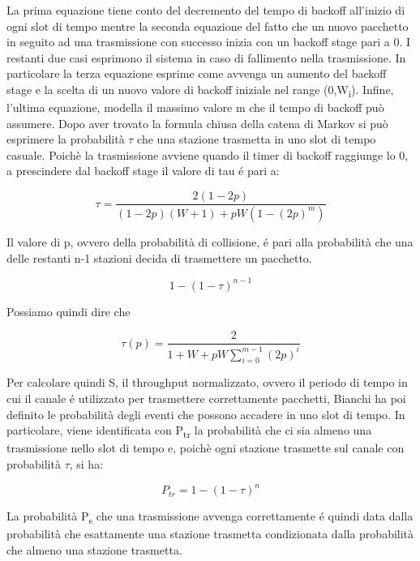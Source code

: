 La prima equazione tiene conto del decremento del tempo di backoff all'inizio di ogni slot di tempo mentre la seconda equazione del fatto che un nuovo pacchetto in seguito ad una trasmissione con successo inizia con un backoff stage pari a 0.
I restanti due casi esprimono il sistema in caso di fallimento nella trasmissione.
In particolare la terza equazione esprime come avvenga un aumento del backoff stage e la scelta di un nuovo valore di backoff iniziale nel range (0,W\textsubscript{i}).
Infine, l'ultima equazione, modella il massimo valore m che il tempo di backoff pu\`o assumere.
Dopo aver trovato la formula chiusa della catena di Markov si pu\`o esprimere la probabilit\`a $\tau$ che una stazione trasmetta in uno slot di tempo casuale.
Poich\`e la trasmissione avviene quando il timer di backoff raggiunge lo 0, a prescindere dal backoff stage il valore di tau \'e pari a:


\begin{equation}
\tau = \frac{2(1-2p)}{(1-2p)(W+1)+pW(1-(2p)^m)}
\end{equation}

Il valore di p, ovvero della probabilit\`a di collisione, \'e pari alla probabilit\`a che una delle restanti n-1 stazioni decida di trasmettere un pacchetto.

\begin{equation}
1-(1-\tau)^{n-1}
\end{equation}

Possiamo quindi dire che 

\begin{equation}
\tau(p) = \frac{2}{1+W+pW \sum_{i=0}^{m-1}(2p)^i}
\end{equation}

Per calcolare quindi S, il throughput normalizzato, ovvero il periodo di tempo in cui il canale \'e utilizzato per trasmettere correttamente pacchetti, Bianchi ha poi definito le probabilit\`a degli eventi che possono accadere in uno slot di tempo.
In particolare, viene identificata con P\textsubscript{tr} la probabilit\`a che ci sia almeno una trasmissione nello slot di tempo e, poich\`e ogni stazione trasmette sul canale con probabilit\`a $\tau$, si ha:

\begin{equation}
P_{tr} = 1-(1-\tau)^n
\end{equation}

La probabilit\`a P\textsubscript{s} che una trasmissione avvenga correttamente \'e quindi data dalla probabilit\`a che esattamente una stazione trasmetta condizionata dalla probabilit\`a che almeno una stazione trasmetta.


